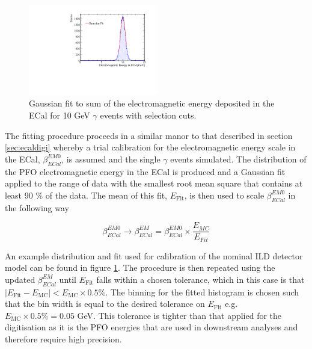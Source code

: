 \begin{figure}
\includegraphics[width=0.5\textwidth]{EnergyEstimators/Plots/Calibration/EMScaleSetting/EMScaleSettingECalFit.pdf}
\caption[Gaussian fit to sum of the electromagnetic energy deposited in the ECal for 10 GeV $\gamma$ events with selection cuts.]{Gaussian fit to sum of the electromagnetic energy deposited in the ECal for 10 GeV $\gamma$ events with selection cuts.}
\label{fig:ecalemscalefit}
\end{figure}

The fitting procedure proceeds in a similar manor to that described in section \ref{sec:ecaldigi} whereby a trial calibration for the electromagnetic energy scale in the ECal, $\beta^{EM0}_{ECal}$, is assumed and the single $\gamma$ events simulated.  The distribution of the PFO electromagnetic energy in the ECal is produced and a Gaussian fit applied to the range of data with the smallest root mean square that contains at least 90 \% of the data.  The mean of this fit, $E_{\text{Fit}}$, is then used to scale $\beta^{EM0}_{ECal}$ in the following way

\begin{equation}
\beta^{EM0}_{ECal} \rightarrow \beta^{EM}_{ECal} = \beta^{EM0}_{ECal} \times \frac{E_{MC}}{E_{Fit}}
\end{equation}

An example distribution and fit used for calibration of the nominal ILD detector model can be found in figure \ref{fig:ecalemscalefit}.  The procedure is then repeated using the updated $\beta^{EM}_{ECal}$ until $E_{\text{Fit}}$ falls within a chosen tolerance, which in this case is that $|E_{\text{Fit}} - E_{\text{MC}}| < E_{\text{MC}} \times 0.5 \%$.  The binning for the fitted histogram is chosen such that the bin width is equal to the desired tolerance on $E_{\text{Fit}}$ e.g. $E_{\text{MC}} \times 0.5 \% = 0.05$ GeV.  This tolerance is tighter than that applied for the digitisation as it is the PFO energies that are used in downstream analyses and therefore require high precision. 
 
